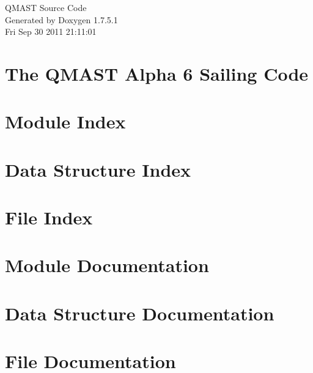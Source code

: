 \documentclass[a4paper]{book}
\begin{document}
\hypersetup{pageanchor=false,citecolor=blue}
\begin{titlepage}
\vspace*{7cm}
\begin{center}
{\Large \-Q\-M\-A\-S\-T \-Source \-Code }\\
\vspace*{1cm}
{\large \-Generated by Doxygen 1.7.5.1}\\
\vspace*{0.5cm}
{\small Fri Sep 30 2011 21:11:01}\\
\end{center}
\end{titlepage}
\clearemptydoublepage
{}
\tableofcontents
\clearemptydoublepage
{}
\hypersetup{pageanchor=true,citecolor=blue}
\chapter{\-The \-Q\-M\-A\-S\-T \-Alpha 6 \-Sailing \-Code}
\label{index}\hypertarget{index}{}
\chapter{\-Module \-Index}

\chapter{\-Data \-Structure \-Index}

\chapter{\-File \-Index}

\chapter{\-Module \-Documentation}


\chapter{\-Data \-Structure \-Documentation}

\chapter{\-File \-Documentation}














\printindex
\end{document}
